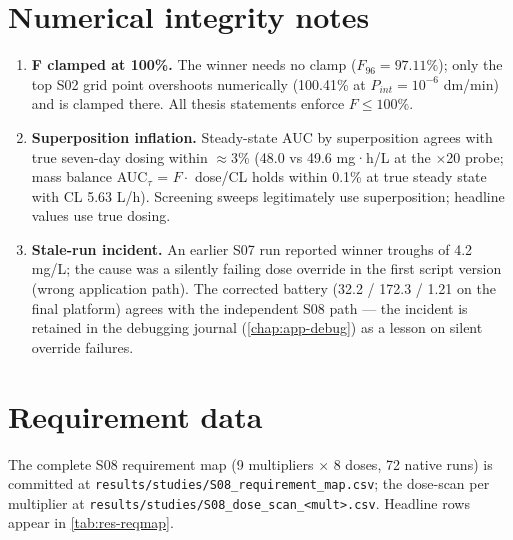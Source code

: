 \section{Numerical integrity notes}
\begin{enumerate}
\item \textbf{F clamped at 100\%.} The winner needs no clamp ($F_{96} = 97.11\%$); only the top S02 grid point overshoots numerically (100.41\% at $P_{int} = 10^{-6}$ dm/min) and is clamped there. All thesis statements enforce $F \leq 100\%$.
\item \textbf{Superposition inflation.} Steady-state AUC by superposition agrees with true seven-day dosing within $\approx$3\% (48.0 vs 49.6 mg·h/L at the $\times$20 probe; mass balance AUC$_{\tau}$ = $F \cdot$ dose/CL holds within 0.1\% at true steady state with CL 5.63 L/h). Screening sweeps legitimately use superposition; headline values use true dosing.
\item \textbf{Stale-run incident.} An earlier S07 run reported winner troughs of 4.2 mg/L; the cause was a silently failing dose override in the first script version (wrong application path). The corrected battery (32.2 / 172.3 / 1.21 on the final platform) agrees with the independent S08 path --- the incident is retained in the debugging journal (\cref{chap:app-debug}) as a lesson on silent override failures.
\end{enumerate}

\section{Requirement data}
The complete S08 requirement map (9 multipliers $\times$ 8 doses, 72 native runs) is committed at \texttt{results/studies/S08\_requirement\_map.csv}; the dose-scan per multiplier at \texttt{results/studies/S08\_dose\_scan\_<mult>.csv}. Headline rows appear in \cref{tab:res-reqmap}.
